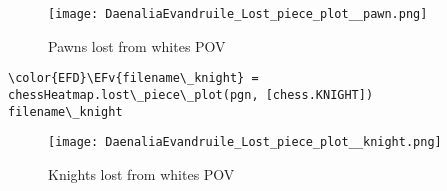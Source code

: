 \documentclass[11pt]{article}
\newcommand{\EFv}[1]{\textcolor{EFv}{#1}} %
\begin{document}
\begin{figure}[htbp]
\centering
\texttt{[image: DaenaliaEvandruile\_Lost\_piece\_plot\_\_pawn.png]}
\caption{Pawns lost from whites POV}
\end{figure}

\newpage

\begin{Code}
\begin{Verbatim}[]
\color{EFD}\EFv{filename\_knight} = chessHeatmap.lost\_piece\_plot(pgn, [chess.KNIGHT])
filename\_knight
\end{Verbatim}
\end{Code}

\begin{figure}[htbp]
\centering
\texttt{[image: DaenaliaEvandruile\_Lost\_piece\_plot\_\_knight.png]}
\caption{Knights lost from whites POV}
\end{figure}
\end{document}
